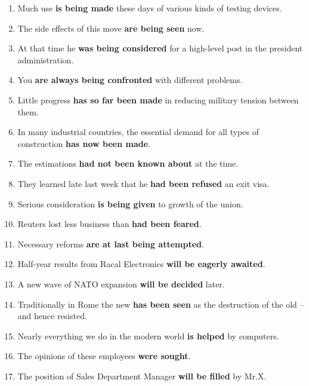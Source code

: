 \documentclass[main.tex]{subfiles}
\begin{document}
\begin{enumerate}[nosep,leftmargin=*]
	\itemsep\eitsp
	\item Much use \textbf{is being made} these days of various kinds of testing devices.
	\item The side effects of this move \textbf{are being seen} now.
	\item At that time he \textbf{was being considered} for a high-level post in the president administration.
	\item You \textbf{are always being confronted} with different problems.
	\item Little progress \textbf{has so far been made} in reducing military tension between them.
	\item In many industrial countries, the essential demand for all types of construction \textbf{has now been made}.
	\item The estimations \textbf{had not been known about} at the time.
	\item They learned late last week that he \textbf{had been refused} an exit visa.
	\item Serious consideration \textbf{is being given} to growth of the union.
	\item Reuters lost less business than \textbf{had been feared}.
	\item Necessary reforms \textbf{are at last being attempted}.
	\item Half-year results from Racal Electronics \textbf{will be eagerly awaited}.
	\item A new wave of NATO expansion \textbf{will be decided} later.
	\item Traditionally in Rome the new \textbf{has been seen} as the destruction of the old -- and hence resisted.
	\item Nearly everything we do in the modern world \textbf{is helped} by computers.
	\item The opinions of these employees \textbf{were sought}.
	\item The position of Sales Department Manager \textbf{will be filled} by Mr.X.
\end{enumerate}

\newpage
\setcounter{subsection}{3}

\end{document}
